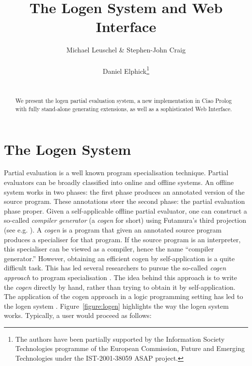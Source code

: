 \documentclass{sig-alternate}
\title{The Logen System and Web Interface}
\author{
\alignauthor Michael Leuschel \& Stephen-John Craig\\
       \affaddr{University of D\"{u}sseldorf, Germany}\\
       \email{leuschel@cs.uni-duesseldorf.de}
\alignauthor Daniel Elphick\thanks{The authors have been partially
supported by the Information Society
Technologies programme of the European Commission, Future and Emerging
Technologies under the IST-2001-38059 ASAP project.}\\
       \affaddr{University of Southampton, United Kingdom}\\
       \email{dre@ecs.soton.ac.uk}
}
\begin{document}
\maketitle

\begin{abstract}
We present the {\sc logen} partial evaluation system, a new implementation in Ciao Prolog with
fully stand-alone generating extensions, as well as a sophisticated Web
Interface.
\end{abstract}


\section{The Logen System}

Partial evaluation \cite{Jones:peval}
 is a well known program specialisation technique.
 Partial evaluators can be broadly classified into
 online and offline systems.
An offline system works in two phases:
 the first phase produces an annotated version of the source program.
These annotations steer the second phase: the partial evaluation
phase proper.
Given a self-applicable offline partial evaluator,
 one can construct a so-called {\em
  compiler generator\/} (a {\em cogen\/} for short) 
  using Futamura's third projection (see e.g. \cite{Jones:peval}).
 A {\em cogen} is a program that given an annotated source
  program produces a specialiser for that program.
If the source program is an interpreter, this specialiser can be
viewed as a compiler, hence the name ``compiler generator.''
However, obtaining an efficient cogen by self-application is a quite difficult task.
This has led several researchers to pursue
 the so-called {\em cogen approach}
to program specialisation
\cite{Holst:89a,HolstLaunchbury:92,%
BirkedalWelinder:94:handcogen,Andersen94:PhD,GlueckJoergensen:PLILP95,%
Thiemann:ICFP96}.
The idea behind this approach is to write
 the {\em cogen\/}  directly by hand, rather than trying to obtain it by
 self-application.
The application of the cogen approach in a logic programming setting
has led to the {\sc logen} system
\cite{JorgensenLeuschel:Cogen,LeuschelEtAl:TPLP03}.
Figure~\ref{figure:logen} highlights the way the {\sc logen} system works.
Typically, a user would proceed as follows:
\end{document}
